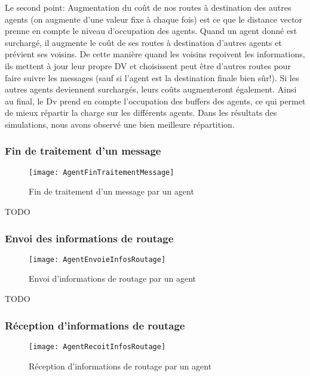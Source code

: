 \documentclass[a4paper,11pt]{article}
\begin{document}
Le second point: \og Augmentation du coût de nos routes à destination des autres agents (on augmente d'une valeur fixe à chaque fois) \fg est ce que le distance vector prenne en compte le niveau d'occupation des agents. Quand un agent donné est surchargé, il augmente le coût de ses routes à destination d'autres agents et prévient ses voisins. De cette manière quand les voisins reçoivent les informations, ils mettent à jour leur propre DV et choisissent peut être d'autres routes pour faire suivre les messages (sauf si l'agent est la destination finale bien sûr!). Si les autres agents deviennent surchargés, leurs coûts augmenteront également. Ainsi au final, le Dv prend en compte l'occupation des buffers des agents, ce qui permet de mieux répartir la charge sur les différents agents. Dans les résultats des simulations, nous avons observé une bien meilleure répartition.


\subsubsection{Fin de traitement d'un message}

\begin{figure}[h!t]
  \centering
    \texttt{[image: AgentFinTraitementMessage]}
  \caption{Fin de traitement d'un message par un agent}
  \label{fig:agent-fin-traitement-message}
\end{figure}

TODO


\subsubsection{Envoi des informations de routage}

\begin{figure}[h!t]
  \centering
    \texttt{[image: AgentEnvoieInfosRoutage]}
  \caption{Envoi d'informations de routage par un agent}
  \label{fig:agent-envoi-infos-routage}
\end{figure}

TODO



\subsubsection{Réception d'informations de routage}

\begin{figure}[h!t]
  \centering
    \texttt{[image: AgentRecoitInfosRoutage]}
  \caption{Réception d'informations de routage par un agent}
  \label{fig:agent-recoit-infos-routage}
\end{figure}
\end{document}
